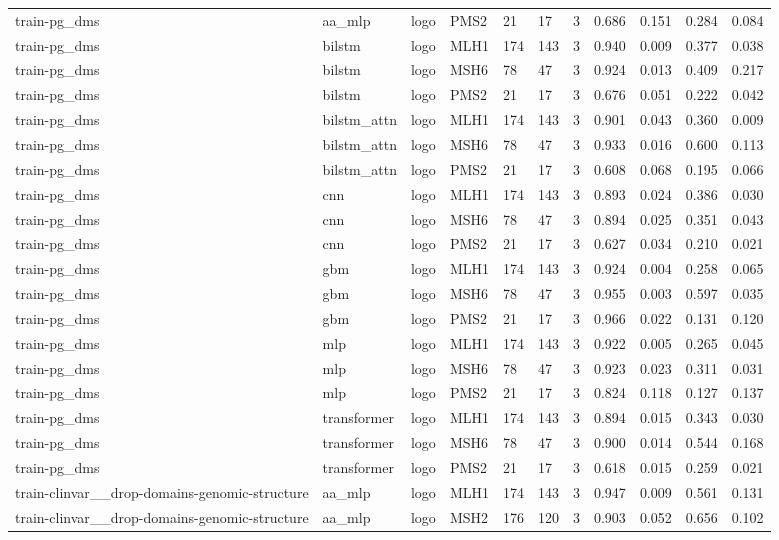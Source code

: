 \begin{table}[t]
\begin{tabular}{lllllllllll}
train-pg\_dms & aa\_mlp & logo & PMS2 & 21 & 17 & 3 & 0.686 & 0.151 & 0.284 & 0.084 \\
train-pg\_dms & bilstm & logo & MLH1 & 174 & 143 & 3 & 0.940 & 0.009 & 0.377 & 0.038 \\
train-pg\_dms & bilstm & logo & MSH6 & 78 & 47 & 3 & 0.924 & 0.013 & 0.409 & 0.217 \\
train-pg\_dms & bilstm & logo & PMS2 & 21 & 17 & 3 & 0.676 & 0.051 & 0.222 & 0.042 \\
train-pg\_dms & bilstm\_attn & logo & MLH1 & 174 & 143 & 3 & 0.901 & 0.043 & 0.360 & 0.009 \\
train-pg\_dms & bilstm\_attn & logo & MSH6 & 78 & 47 & 3 & 0.933 & 0.016 & 0.600 & 0.113 \\
train-pg\_dms & bilstm\_attn & logo & PMS2 & 21 & 17 & 3 & 0.608 & 0.068 & 0.195 & 0.066 \\
train-pg\_dms & cnn & logo & MLH1 & 174 & 143 & 3 & 0.893 & 0.024 & 0.386 & 0.030 \\
train-pg\_dms & cnn & logo & MSH6 & 78 & 47 & 3 & 0.894 & 0.025 & 0.351 & 0.043 \\
train-pg\_dms & cnn & logo & PMS2 & 21 & 17 & 3 & 0.627 & 0.034 & 0.210 & 0.021 \\
train-pg\_dms & gbm & logo & MLH1 & 174 & 143 & 3 & 0.924 & 0.004 & 0.258 & 0.065 \\
train-pg\_dms & gbm & logo & MSH6 & 78 & 47 & 3 & 0.955 & 0.003 & 0.597 & 0.035 \\
train-pg\_dms & gbm & logo & PMS2 & 21 & 17 & 3 & 0.966 & 0.022 & 0.131 & 0.120 \\
train-pg\_dms & mlp & logo & MLH1 & 174 & 143 & 3 & 0.922 & 0.005 & 0.265 & 0.045 \\
train-pg\_dms & mlp & logo & MSH6 & 78 & 47 & 3 & 0.923 & 0.023 & 0.311 & 0.031 \\
train-pg\_dms & mlp & logo & PMS2 & 21 & 17 & 3 & 0.824 & 0.118 & 0.127 & 0.137 \\
train-pg\_dms & transformer & logo & MLH1 & 174 & 143 & 3 & 0.894 & 0.015 & 0.343 & 0.030 \\
train-pg\_dms & transformer & logo & MSH6 & 78 & 47 & 3 & 0.900 & 0.014 & 0.544 & 0.168 \\
train-pg\_dms & transformer & logo & PMS2 & 21 & 17 & 3 & 0.618 & 0.015 & 0.259 & 0.021 \\
train-clinvar\_\_drop-domains-genomic-structure & aa\_mlp & logo & MLH1 & 174 & 143 & 3 & 0.947 & 0.009 & 0.561 & 0.131 \\
train-clinvar\_\_drop-domains-genomic-structure & aa\_mlp & logo & MSH2 & 176 & 120 & 3 & 0.903 & 0.052 & 0.656 & 0.102 \\

\end{tabular}
\end{table}
